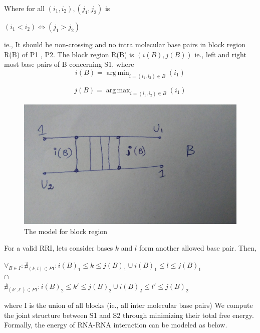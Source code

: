 \documentclass[twoside,a4paper]{report}
\DeclareMathOperator*{\argmin}{arg\,min}
\DeclareMathOperator*{\argmax}{arg\,max}
\begin{document}
 	Where for all $(i_1 ,i_2) ,(j_1, j_2) $ is 
 	
 	\begin{center}
 		$(i_1 < i_2) \iff  (j_1 > j_2)$
 	\end{center}
 	
 	ie., It should be non-crossing and no intra molecular base pairs in block region R(B) of P1 , P2. The block region R(B) is $(i(B) , j(B))$ ie., left and right most base pairs of B concerning S1, where\\
 	
 	\begin{equation*}
 		i(B) = \argmin_{i = (i_1, i_2 ) \in B } (i_1)
 	\end{equation*}
 
 	\begin{equation*}
 			j(B) = \argmax_{i = (i_1, i_2 ) \in B} (i_1)
 	\end{equation*}
 	
 	\begin{figure}[H]
 		\includegraphics[width=0.6\linewidth]{region}
 		\centering
 		\caption{The model for block region }
 		\label{fig:region}
 	\end{figure}
 	
 	For a valid RRI, lets consider bases $k$ and $l$ form another allowed base pair. Then,
 	
 	\begin{center}
 		 $\forall_{B\in I } :\nexists_{(k,l) \in P1} : i(B)_1 \le k \le j(B)_1  \cup   i(B)_1 \le l \le j(B)_1 $ \\$\cap $\\ 	$\nexists_{(k',l') \in P1} : i(B)_2 \le k' \le j(B)_2  \cup  i(B)_2 \le l' \le j(B)_2 $
 	\end{center}
 	
 	where I is the union of all blocks (ie., all inter molecular base pairs)
 	We compute the joint structure between S1 and S2 through minimizing their total free energy. Formally, the energy of RNA-RNA interaction \citep{muckstein2006thermodynamics} can be modeled as below.\\
 	
\end{document}
